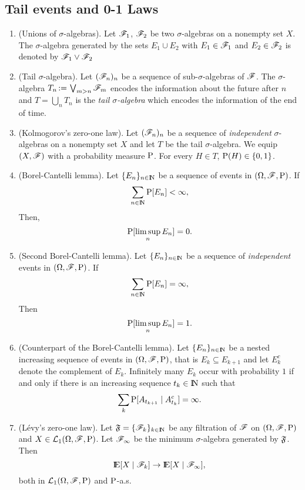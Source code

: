 \documentclass[a4paper,10pt]{article}
\begin{document}
\subsection{Tail events and 0-1 Laws}
\begin{enumerate}
 \item (Unions of $\sigma$-algebras). Let $\mathscr{F}_1$, $\mathscr{F}_2$ be two $\sigma$-algebras on a nonempty set $X$.
       The $\sigma$-algebra generated by the sets $E_1\cup E_2$ with $E_1\in\mathscr{F}_1$ and $E_2\in\mathscr{F}_2$ is 
       denoted by $\mathscr{F}_1 \vee \mathscr{F}_2$
 
 \item (Tail $\sigma$-algebra). Let $(\mathscr{F}_n)_{n}$ be a sequence of sub-$\sigma$-algebras of $\mathscr{F}$.
       The $\sigma$-algebra $T_n{}\mathop{\mathrel{:}=}{} \bigvee_{m>n}\mathscr{F}_m$ encodes the information about the future 
       after $n$ and $T=\bigcup_n T_n$ is the \textit{tail $\sigma$-algebra} which encodes the 
       information of the end of time. 
 
 \item (Kolmogorov's zero-one law). Let $(\mathscr{F}_n)_n$ be a sequence of \textit{independent}
       $\sigma$-algebras on a nonempty set $X$ and let $T$ be the tail $\sigma$-algebra.
       We equip $(X,\mathscr{F})$ with a probability measure $\mathrm{P}$. For every $H\in T$,
       $\mathrm{P}(H)\in\{0,1\}$.
 
 \item (Borel-Cantelli lemma). Let $\{E_n\}_{n\in\N}$ be a sequence of events in $(\Omega,\mathscr{F},\mathrm{P})$. If
 \[
  \sum_{n\in\N}\prob[E_n] < \infty,
 \]
 Then,
 \[
  \mathrm{P}[\limsup_n E_n] = 0.
 \]

 \item (Second Borel-Cantelli lemma). Let $\{E_n\}_{n\in\N}$ be a sequence of \textit{independent} events in $(\Omega,\mathscr{F},\mathrm{P})$. If
 \[
  \sum_{n\in\N}\prob[E_n] = \infty,
 \]
 Then
 \[
  \mathrm{P}[\limsup_n E_n] = 1.
 \]
 \item (Counterpart of the Borel-Cantelli lemma). 
 Let $\{E_n\}_{n\in\N}$ be a nested increasing sequence of events in $(\Omega,\mathscr{F},\mathrm{P})$, that is 
 $E_k\subseteq E_{k+1}$ and let $E_k^c$ denote the complement of $E_k$.
 Infinitely many $E_k$ occur with probability $1$ if and only if there is an increasing sequence 
 $t_k\in\N$ such that
 \[
  \sum_k \mathrm{P}[A_{t_{k+1}}\mid A_{t_k}^c]  = \infty.
 \] 
 
 \item (L\'evy's zero-one law). Let $\Ff=\{\F_k\}_{k\in\N}$ be any filtration of $\mathscr{F}$ on $(\Omega,\mathscr{F},\mathrm{P})$ and
 $X\in\mathcal{L}_1(\Omega,\mathscr{F},\mathrm{P})$. Let $\mathscr{F}_\infty$ be the minimum $\sigma$-algebra generated by $\mathfrak{F}$. Then
 \[
  \E[X\mid \F_k] \to \E[X\mid \F_\infty], 
 \]
 both in $\mathcal{L}_1(\Omega,\mathscr{F},\mathrm{P})$ and $\mathrm{P}$-a.s.

 

\end{enumerate}
\end{document}
